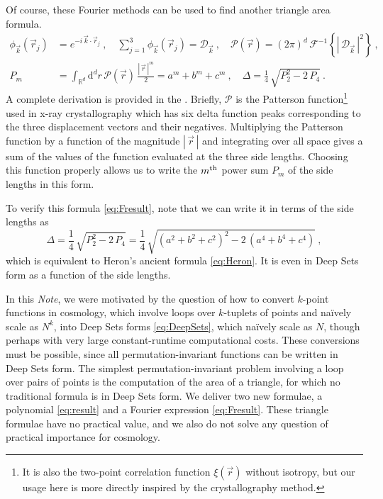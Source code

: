 \documentclass[10pt]{article}
\newcommand{\documentname}{\textsl{Note}}
\newcommand{\secbreak}{\bigskip{\centering\footnotesize%
\rotatebox[origin=c]{55}{$\triangle$}~~~%
\rotatebox[origin=c]{35}{$\triangle$}~~~%
\rotatebox[origin=c]{15}{$\triangle$}\par}\bigskip\noindent}
\renewcommand{\d}{\mathrm{d}}
\newcommand{\abs}[1]{|\,{#1}\,|}
\begin{document}
Of course, these Fourier methods can be used to find another triangle area formula.
\begin{align}
    \phi_{\vec{k}} (\vec{r}_j) &= e^{-i \, \vec{k} \cdot \vec{r}_j}~,
    \quad
    \sum_{j=1}^{3} \phi_{\vec{k}}(\vec{r}_j) = \mathcal{D}_{\vec{k}}~,
    \quad
    \mathcal{P}(\vec{r}) = (2\pi)^d \, \mathcal{F}^{-1}\!\left\{
    \abs{ \mathcal{D}_{\vec{k}} }^2 \right\}~,
    \nonumber\\
    P_m &= \int_{\mathbb{R}^d} \d^d r \, \mathcal{P}(\vec{r}) \, \frac{\abs{\vec{r}}^m}{2}
    = a^m+b^m+c^m
    ~,
    \quad
    \Delta
    = \frac{1}{4} \, \sqrt{P_2^2 - 2 \, P_4}~.
    \label{eq:Fresult}
\end{align}
A complete derivation is provided in the .
Briefly, $\mathcal{P}$ is the Patterson function\footnote{%
    It is also the two-point correlation function $\xi(\vec{r})$ without isotropy, but our usage here is more directly inspired by the crystallography method.}
used in x-ray crystallography \citep{Patterson1934} which has six delta function peaks corresponding to the three displacement vectors and their negatives.
Multiplying the Patterson function by a function of the magnitude $\abs{\vec{r}}$ and integrating over all space gives a sum of the values of the function evaluated at the three side lengths. 
Choosing this function properly allows us to write the $m^{\rm th}$ power sum $P_m$ of the side lengths in this form.

To verify this formula \eqref{eq:Fresult}, note that we can write it in terms of the side lengths as
\begin{equation}
\label{eq:HeronDeepSets}
    \Delta = \frac{1}{4} \, \sqrt{
        P_2^2
        - 2 \, P_4
    }
    = \frac{1}{4} \, \sqrt{
        \left( a^2 + b^2 + c^2 \right)^2
        - 2 \, \left( a^4 + b^4 + c^4 \right)
    }~,
\end{equation}
which is equivalent to Heron's ancient formula \eqref{eq:Heron}.
It is even in Deep Sets form as a function of the side lengths.

\secbreak
In this \documentname, we were motivated by the question of how to convert $k$-point functions in cosmology, which involve loops over $k$-tuplets of points and na\"ively scale as $N^k$, into Deep Sets forms \eqref{eq:DeepSets}, which na\"ively scale as $N$, though perhaps with very large constant-runtime computational costs.
These conversions must be possible, since all permutation-invariant functions can be written in Deep Sets form.
The simplest permutation-invariant problem involving a loop over pairs of points is the computation of the area of a triangle, for which no traditional formula is in Deep Sets form.
We deliver two new formulae, a polynomial \eqref{eq:result} and a Fourier expression \eqref{eq:Fresult}.
These triangle formulae have no practical value, and we also do not solve any question of practical importance for cosmology.
\end{document}
